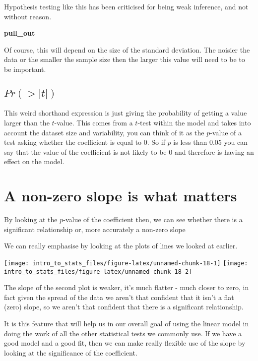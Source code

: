 \documentclass[]{book}
\begin{document}
Hypothesis testing like this has been criticised for being weak inference, and not without reason.

\textbf{pull\_out}

Of course, this will depend on the size of the standard deviation. The noisier the data or the smaller the sample size then the larger this value will need to be to be important.

\hypertarget{prt}{%
\subsection{\texorpdfstring{\(Pr(>|t|)\)}{Pr(\textgreater{}\textbar{}t\textbar{})}}\label{prt}}

This weird shorthand expression is just giving the probability of getting a value larger than the \(t\)-value. This comes from a \(t\)-test within the model and takes into account the dataset size and variability, you can think of it as the \(p\)-value of a test asking whether the coefficient is equal to 0. So if \(p\) is less than 0.05 you can say that the value of the coefficient is not likely to be 0 and therefore is having an effect on the model.

\hypertarget{a-non-zero-slope-is-what-matters}{%
\section{A non-zero slope is what matters}\label{a-non-zero-slope-is-what-matters}}

By looking at the \(p\)-value of the coefficient then, we can see whether there is a significant relationship or, more accurately a non-zero slope

We can really emphasise by looking at the plots of lines we looked at earlier.

\texttt{[image: intro\_to\_stats\_files/figure-latex/unnamed-chunk-18-1]} \texttt{[image: intro\_to\_stats\_files/figure-latex/unnamed-chunk-18-2]}

The slope of the second plot is weaker, it's much flatter - much closer to zero, in fact given the spread of the data we aren't that confident that it isn't a flat (zero) slope, so we aren't that confident that there is a significant relationship.

It is this feature that will help us in our overall goal of using the linear model in doing the work of all the other statistical tests we commonly use. If we have a good model and a good fit, then we can make really flexible use of the slope by looking at the significance of the coefficient.
\end{document}
